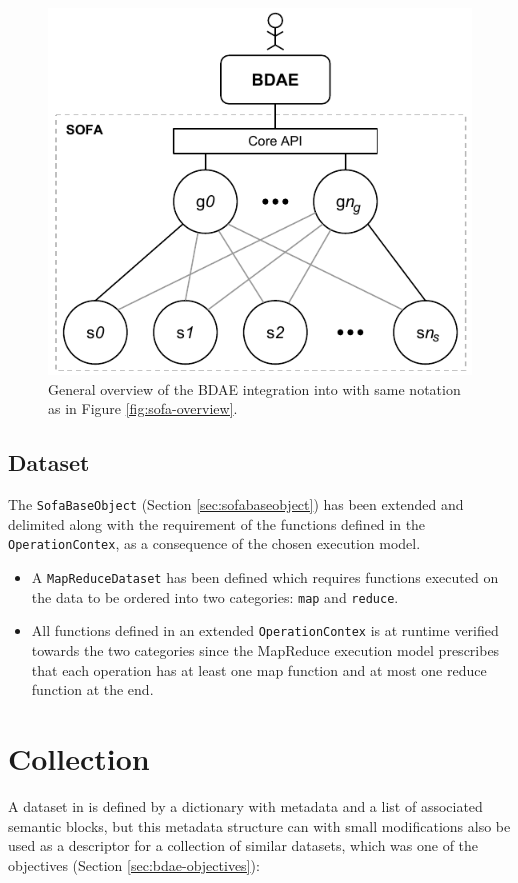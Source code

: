 \begin{figure}
	\centering
	\includegraphics[scale=0.9]{pdf/bdae-overview.pdf}
	\caption[General overview of the BDAE]{General overview of the BDAE integration into \CodeName with same notation as in Figure \ref{fig:sofa-overview}. \label{fig:bdae-overview}}
\end{figure}	


\subsection{Dataset}
The \texttt{SofaBaseObject} (Section \ref{sec:sofabaseobject}) has been extended and delimited along with the requirement of the functions defined in the \texttt{OperationContex}, as a consequence of the chosen execution model. 
\begin{itemize}
	\item A \texttt{MapReduceDataset} has been defined which requires functions executed on the data to be ordered into two categories: \texttt{map} and \texttt{reduce}. 
	\item All functions defined in an extended \texttt{OperationContex} is at runtime verified towards the two categories since the MapReduce execution model prescribes that each operation has at least one map function and at most one reduce function at the end.
\end{itemize}

\section{Collection} \label{sec:collection}
A dataset in \CodeName is defined by a dictionary with metadata and a list of associated semantic blocks, but this metadata structure can with small modifications also be used as a descriptor for a collection of similar datasets, which was one of the objectives (Section \ref{sec:bdae-objectives}):

